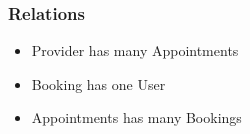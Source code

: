 \documentclass{article}
\begin{document}
    \subsubsection*{Relations}
    \begin{itemize}
        \item Provider has many Appointments
        \item Booking has one User
        \item Appointments has many Bookings
    \end{itemize}
\end{document}
